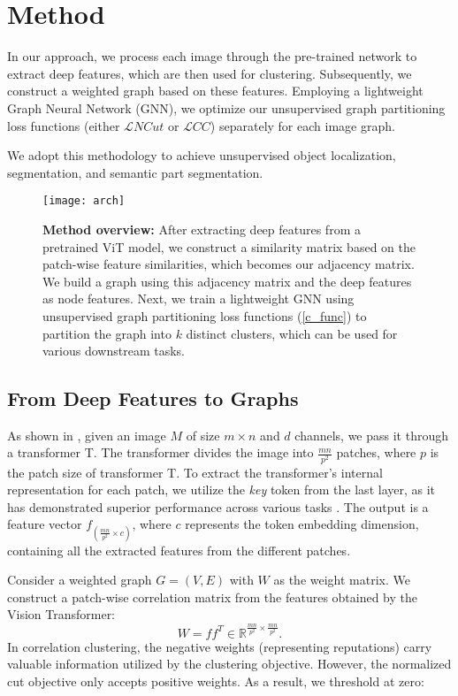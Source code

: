 \documentclass[10pt,twocolumn,letterpaper]{article}
\begin{document}
\section{Method}\label{sec:method}
In our approach, we process each image through the pre-trained network to extract deep features, which are then used for clustering. Subsequently, we construct a weighted graph based on these features. Employing a lightweight Graph Neural Network (GNN), we optimize our unsupervised graph partitioning loss functions (either $\mathcal{L}{NCut}$ or $\mathcal{L}{CC}$) separately for each image graph.

We adopt this methodology to achieve unsupervised object localization, segmentation, and semantic part segmentation.
  
\begin{figure*}[ht]
\texttt{[image: arch]}
\caption{
\textbf{Method overview:} After extracting deep features from a pretrained ViT model, we construct a similarity matrix based on the patch-wise feature similarities, which becomes our adjacency matrix. We build a graph using this adjacency matrix and the deep features as node features. Next, we train a lightweight GNN using unsupervised graph partitioning loss functions (\cref{c_func}) to partition the graph into $k$ distinct clusters, which can be used for various downstream tasks.
}
\label{fig:arch}
\end{figure*}

\subsection{From Deep Features to Graphs}\label{sec:deep_to}
As shown in , given an image $M$ of size $m \times n$ and $d$ channels, we pass it through a transformer T. 
The transformer divides the image into $\frac{mn}{p^2}$ patches,
where $p$ is the patch size of transformer T. To extract the transformer's internal representation for each patch, we utilize the \emph{key} token from the last layer, as it has demonstrated superior performance across various tasks \cite{amir2021deep, melas2022deep}. The output is a feature vector $f_{(\frac{mn}{p^2} \times c)}$, where $c$ represents the token embedding dimension, containing all the extracted features from the different patches.

Consider a weighted graph $G = (V, E)$ with $W$ as the weight matrix. We construct a patch-wise correlation matrix from the features obtained by the Vision Transformer:
\begin{equation}
	W = ff^T \in \mathbb{R}^{\frac{mn}{p^2} \times \frac{mn}{p^2}}.
  \label{eq:cc_adj}
\end{equation}
In correlation clustering, the negative weights (representing reputations) carry valuable information utilized by the clustering objective. However, the normalized cut objective only accepts positive weights. As a result, we threshold at zero:
\end{document}
